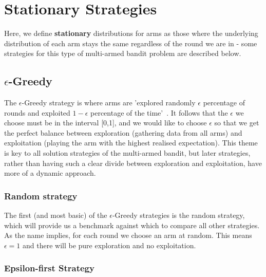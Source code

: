 \section{Stationary Strategies}\label{sec:stationary-strategies}
Here, we define \textbf{stationary} distributions for arms as those where the underlying distribution of each arm stays the same regardless of the round we are in - some strategies for this type of multi-armed bandit problem are described below.

\subsection{$\epsilon$-Greedy}\label{subsec: $epsilon$-greedy}
The $\epsilon$-Greedy strategy is where arms are 'explored randomly $\epsilon$ percentage of rounds and exploited $1-\epsilon$ percentage of the time'~\citep{DBLP:journals/corr/abs-1807-09809}.
It follows that the $\epsilon$ we choose must be in the interval [0,1], and we would like to choose $\epsilon$ so that we get the perfect balance between exploration (gathering data from all arms) and exploitation (playing the arm with the highest realised expectation).
This theme is key to all solution strategies of the multi-armed bandit, but later strategies, rather than having such a clear divide between exploration and exploitation, have more of a dynamic approach.

\subsubsection{Random strategy}
The first (and most basic) of the $\epsilon$-Greedy strategies is the random strategy, which will provide us a benchmark against which to compare all other strategies.
As the name implies, for each round we choose an arm at random.
This means $\epsilon=1$ and there will be pure exploration and no exploitation.

\subsubsection{Epsilon-first Strategy}

